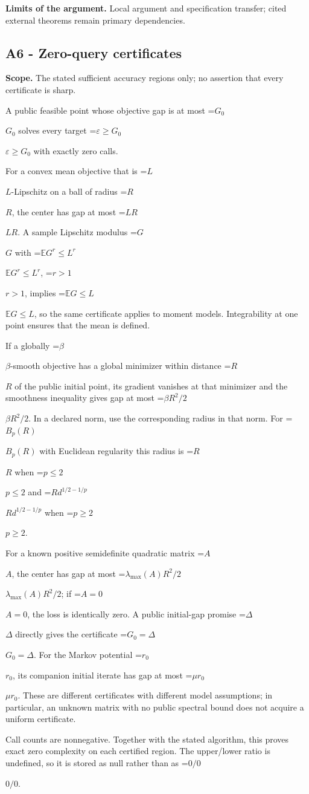 \documentclass[10pt,a4paper]{article}
\newcommand{\AtlasMath}[1]{\par\begingroup\centering\setbox0=\hbox{$\displaystyle #1$}\ifdim\wd0>1.4\linewidth\typeout{ATLAS WIDE FORMULA: \the\wd0}\fi\ifdim\wd0>\linewidth\resizebox{\linewidth}{!}{\box0}\else\box0\fi\par\endgroup}
\newcommand{\AtlasInlineMath}[1]{\begingroup\setbox0=\hbox{$#1$}\ifdim\wd0>.4\linewidth\endgroup\AtlasMath{#1}\else\endgroup$#1$\fi}
\begin{document}
\textbf{Limits of the argument.} Local argument and specification transfer; cited external theorems remain primary dependencies.

\subsection{A6 - Zero-query certificates}
\textbf{Scope.} The stated sufficient accuracy regions only; no assertion that every certificate is sharp.

A public feasible point whose objective gap is at most \AtlasInlineMath{G_0} solves every target \AtlasInlineMath{\varepsilon\ge G_0} with exactly zero calls.

For a convex mean objective that is \AtlasInlineMath{L}-Lipschitz on a ball of radius \AtlasInlineMath{R}, the center has gap at most \AtlasInlineMath{LR}. A sample Lipschitz modulus \AtlasInlineMath{G} with \AtlasInlineMath{\mathbb E G^r\le L^r}, \AtlasInlineMath{r>1}, implies \AtlasInlineMath{\mathbb E G\le L}, so the same certificate applies to moment models. Integrability at one point ensures that the mean is defined.

If a globally \AtlasInlineMath{\beta}-smooth objective has a global minimizer within distance \AtlasInlineMath{R} of the public initial point, its gradient vanishes at that minimizer and the smoothness inequality gives gap at most \AtlasInlineMath{\beta R^2/2}. In a declared norm, use the corresponding radius in that norm. For \AtlasInlineMath{B_p(R)} with Euclidean regularity this radius is \AtlasInlineMath{R} when \AtlasInlineMath{p\le2} and \AtlasInlineMath{R d^{1/2-1/p}} when \AtlasInlineMath{p\ge2}.

For a known positive semidefinite quadratic matrix \AtlasInlineMath{A}, the center has gap at most \AtlasInlineMath{\lambda_{\max}(A)R^2/2}; if \AtlasInlineMath{A=0}, the loss is identically zero. A public initial-gap promise \AtlasInlineMath{\Delta} directly gives the certificate \AtlasInlineMath{G_0=\Delta}. For the Markov potential \AtlasInlineMath{r_0}, its companion initial iterate has gap at most \AtlasInlineMath{\mu r_0}. These are different certificates with different model assumptions; in particular, an unknown matrix with no public spectral bound does not acquire a uniform certificate.

Call counts are nonnegative. Together with the stated algorithm, this proves exact zero complexity on each certified region. The upper/lower ratio is undefined, so it is stored as null rather than as \AtlasInlineMath{0/0}.
\end{document}
